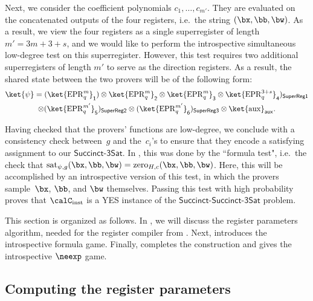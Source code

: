 \documentclass[11pt]{article}
\newcommand{\succinct}{\mathsf{Succinct}\text{-}\mathsf{3Sat}}
\newcommand{\succinctsquared}{\mathsf{Succinct}\text{-}\mathsf{Succinct}\text{-}\mathsf{3Sat}}
\newcommand{\reg}[1]{{\mathsf{#1}}}
\begin{document}
Next, we consider the coefficient polynomials $c_1, \ldots, c_{m'}$.
They are evaluated on the concatenated outputs of the four registers, i.e.\ the string $(\bx, \bb, \bw)$.
As a result, we view the four registers as a single superregister of length $m' = 3 m + 3 + s$,
and we would like to perform the introspective simultaneous low-degree test on this superregister.
However, this test requires two additional superregisters of length $m'$ to serve as the direction registers.
As a result, the shared state between the two provers will be of the following form:
\begin{multline*}
\ket{\psi} = 
(\ket{\mathrm{EPR}_q^m}_{\reg{1}})
\otimes \ket{\mathrm{EPR}_q^m}_{\reg{2}}
\otimes \ket{\mathrm{EPR}_q^m}_{\reg{3}}
\otimes \ket{\mathrm{EPR}_q^{3+s}}_{\reg{4}})_{\reg{Super Reg 1}}\\
\otimes (\ket{\mathrm{EPR}_q^{m'}}_{\reg{5}})_{\reg{Super Reg 2}}
\otimes (\ket{\mathrm{EPR}_q^{m'}}_{\reg{6}})_{\reg{Super Reg 3}}
\otimes \ket{\mathrm{aux}}_{\reg{aux}}.
\end{multline*}

Having checked that the provers' functions are low-degree,
we conclude with a consistency check between~$g$ and the~$c_i$'s
to ensure that they encode a satisfying assignment to our $\succinct$.
In ,
this was done by the ``formula test",
i.e.\ the check that $\mathrm{sat}_{\psi, g}(\bx, \bb, \bw) = \mathrm{zero}_{H, c}(\bx, \bb, \bw)$.
Here, this will be accomplished by an introspective version of this test,
in which the provers sample~$\bx$, $\bb$, and $\bw$ themselves.
Passing this test with high probability proves
that $\calC_{\mathrm{inst}}$ is a YES instance of the $\succinctsquared$ problem.

This section is organized as follows.
In , we will discuss the register parameters algorithm,
needed for the register compiler from .
Next,  introduces the introspective formula game.
Finally,  completes the construction and gives the introspective $\neexp$ game.

\subsection{Computing the register parameters}\label{sec:computing-registers}
\end{document}
